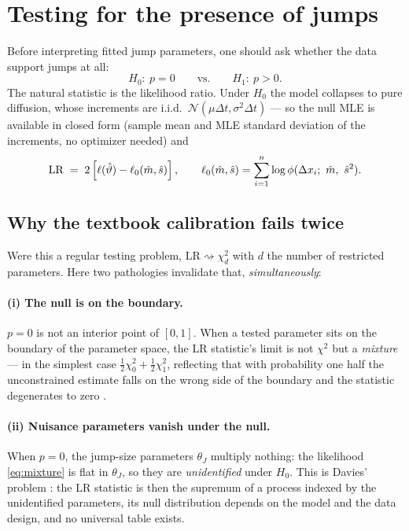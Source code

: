 \section{Testing for the presence of jumps}
\label{sec:jumptest}

Before interpreting fitted jump parameters, one should ask whether the
data support jumps at all:
\begin{equation}
  H_0:\ p = 0
  \qquad \text{vs.} \qquad
  H_1:\ p > 0.
  \label{eq:jump-hypotheses}
\end{equation}
The natural statistic is the likelihood ratio. Under $H_0$ the model
collapses to pure diffusion, whose increments are i.i.d.\
$\mathcal N(\mu\Delta t, \sigma^2\Delta t)$ --- so the null MLE is
available in closed form (sample mean and MLE standard deviation of the
increments, no optimizer needed) and
\begin{equation}
  \mathrm{LR}
  \;=\;
  2\left[ \ell(\hat{\vartheta}) - \ell_0(\hat m, \hat s) \right],
  \qquad
  \ell_0(\hat m, \hat s) = \sum_{i=1}^{n}
  \log \phi(\Delta x_i;\ \hat m,\ \hat s^2).
  \label{eq:lr}
\end{equation}

\subsection{Why the textbook calibration fails twice}

Were this a regular testing problem, $\mathrm{LR} \rightsquigarrow
\chi^2_{d}$ with $d$ the number of restricted parameters. Here two
pathologies invalidate that, \emph{simultaneously}:

\paragraph{(i) The null is on the boundary.} $p = 0$ is not an interior
point of $[0, 1]$. When a tested parameter sits on the boundary of the
parameter space, the LR statistic's limit is not $\chi^2$ but a
\emph{mixture} --- in the simplest case
$\tfrac12 \chi^2_0 + \tfrac12 \chi^2_1$, reflecting that with probability
one half the unconstrained estimate falls on the wrong side of the
boundary and the statistic degenerates to zero
\citep{Chernoff1954, SelfLiang1987}.

\paragraph{(ii) Nuisance parameters vanish under the null.} When $p = 0$,
the jump-size parameters $\theta_J$ multiply nothing: the likelihood
\eqref{eq:mixture} is flat in $\theta_J$, so they are \emph{unidentified}
under $H_0$. This is Davies' problem \citep{Davies1977, Davies1987}: the
LR statistic is then the supremum of a process indexed by the unidentified
parameters, its null distribution depends on the model and the data
design, and no universal table exists.

